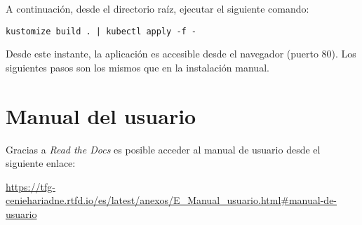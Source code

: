 A continuación, desde el directorio raíz, ejecutar el
siguiente comando:

\begin{verbatim}
kustomize build . | kubectl apply -f -
\end{verbatim}

Desde este instante, la aplicación es accesible desde el navegador
(puerto 80). Los siguientes pasos son los mismos que en la instalación manual.


\section{Manual del usuario}

Gracias a \emph{Read the Docs} es posible acceder al manual de usuario desde el siguiente enlace:

\begin{mdframed}[outerlinecolor=red,outerlinewidth=2pt,linecolor=mucolor,middlelinewidth=3pt,roundcorner=10pt,nobreak=true]
  \begin{center}
    \url{https://tfg-ceniehariadne.rtfd.io/es/latest/anexos/E_Manual_usuario.html#manual-de-usuario}
  \end{center}
\end{mdframed}




